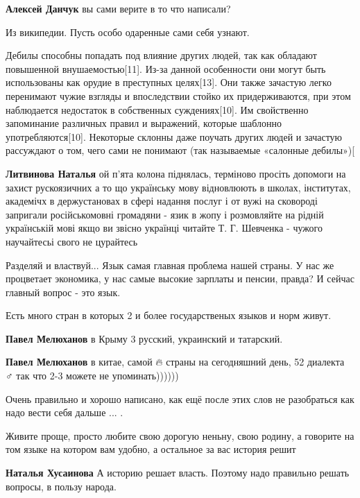 \begin{itemize}
\begin{itemize}
\textbf{Алексей Данчук} вы сами верите в то что написали?

Из википедии. Пусть особо одаренные сами себя узнают.

Дебилы способны попадать под влияние других людей, так как обладают повышенной
внушаемостью[11]. Из-за данной особенности они могут быть использованы как
орудие в преступных целях[13]. Они также зачастую легко перенимают чужие
взгляды и впоследствии стойко их придерживаются, при этом наблюдается
недостаток в собственных суждениях[10]. Им свойственно запоминание различных
правил и выражений, которые шаблонно употребляются[10]. Некоторые склонны даже
поучать других людей и зачастую рассуждают о том, чего сами не понимают (так
называемые «салонные дебилы»)[

\textbf{Литвинова Наталья} ой п'ята колона піднялась, терміново просіть
допомоги на захист рускоязичних а то що українську мову відновлюють в школах,
інститутах, академічх в держустановах в сфері надання послуг і от вужі на
сковороді запригали російськомовні громадяни - язик в жопу і розмовляйте на
рідній українській мові якщо ви звісно українці читайте Т. Г. Шевченка - чужого
научайтесьі свого не цурайтесь

\end{itemize}


Разделяй и властвуй... Язык самая главная проблема нашей страны. У нас же
процветает экономика, у нас самые высокие зарплаты и пенсии, правда? И сейчас
главный вопрос - это язык.

Есть много стран в которых 2 и более государственых языков и норм живут.

\textbf{Павел Мелюханов} в Крыму 3 русский, украинский и татарский.

\textbf{Павел Мелюханов} в китае, самой 🔥 страны на сегодняшний день, 52
диалекта 🤷♂️ так что 2-3 можете не упоминать))))))

Очень правильно и хорошо написано, как ещё после этих слов не разобраться как
надо вести себя дальше ... .


Живите проще, просто любите свою дорогую неньну, свою родину, а говорите на том
языке на котором вам удобно, а остальное за вас история решит

\textbf{Наталья Хусаинова} А историю решает власть. Поэтому надо правильно
решать вопросы, в пользу народа.


\end{itemize}
